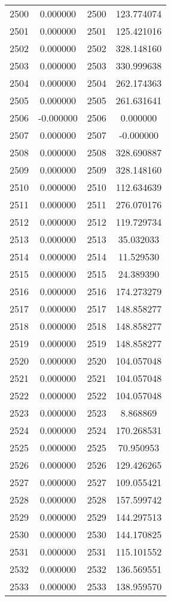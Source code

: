 \documentclass[12pt]{article}
\begin{document}
\begin{longtable}{@{}cccc@{}}
2500 & 0.000000 & 2500 & 123.774074 \\
2501 & 0.000000 & 2501 & 125.421016 \\
2502 & 0.000000 & 2502 & 328.148160 \\
2503 & 0.000000 & 2503 & 330.999638 \\
2504 & 0.000000 & 2504 & 262.174363 \\
2505 & 0.000000 & 2505 & 261.631641 \\
2506 & -0.000000 & 2506 & 0.000000 \\
2507 & 0.000000 & 2507 & -0.000000 \\
2508 & 0.000000 & 2508 & 328.690887 \\
2509 & 0.000000 & 2509 & 328.148160 \\
2510 & 0.000000 & 2510 & 112.634639 \\
2511 & 0.000000 & 2511 & 276.070176 \\
2512 & 0.000000 & 2512 & 119.729734 \\
2513 & 0.000000 & 2513 & 35.032033 \\
2514 & 0.000000 & 2514 & 11.529530 \\
2515 & 0.000000 & 2515 & 24.389390 \\
2516 & 0.000000 & 2516 & 174.273279 \\
2517 & 0.000000 & 2517 & 148.858277 \\
2518 & 0.000000 & 2518 & 148.858277 \\
2519 & 0.000000 & 2519 & 148.858277 \\
2520 & 0.000000 & 2520 & 104.057048 \\
2521 & 0.000000 & 2521 & 104.057048 \\
2522 & 0.000000 & 2522 & 104.057048 \\
2523 & 0.000000 & 2523 & 8.868869 \\
2524 & 0.000000 & 2524 & 170.268531 \\
2525 & 0.000000 & 2525 & 70.950953 \\
2526 & 0.000000 & 2526 & 129.426265 \\
2527 & 0.000000 & 2527 & 109.055421 \\
2528 & 0.000000 & 2528 & 157.599742 \\
2529 & 0.000000 & 2529 & 144.297513 \\
2530 & 0.000000 & 2530 & 144.170825 \\
2531 & 0.000000 & 2531 & 115.101552 \\
2532 & 0.000000 & 2532 & 136.569551 \\
2533 & 0.000000 & 2533 & 138.959570 \\

\end{longtable}
\end{document}
